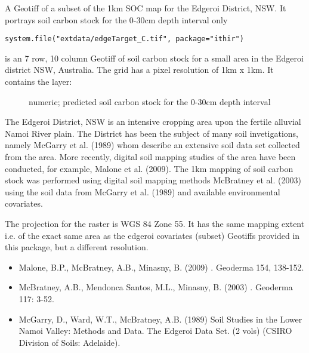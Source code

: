 \documentclass[a4paper]{book}
\begin{document}
%
\begin{Description}
A Geotiff of a subset of the 1km SOC map for the Edgeroi District, NSW. It portrays soil carbon stock for the 0-30cm depth interval only
\end{Description}
%
\begin{Usage}
\begin{verbatim}
system.file("extdata/edgeTarget_C.tif", package="ithir")
\end{verbatim}
\end{Usage}
%
\begin{Format}
 is an 7 row, 10 column Geotiff of soil carbon stock for a small area in the Edgeroi district NSW, Australia. The grid has a pixel resolution of 1km x 1km. It contains the layer:
\begin{description}

\item[] numeric; predicted soil carbon stock for the 0-30cm depth interval

\end{description}

\end{Format}
%
\begin{Details}
The Edgeroi District, NSW is an intensive cropping area upon the fertile alluvial Namoi River plain. The District has been the subject of many soil invetigations, namely McGarry et al. (1989) whom describe an extensive soil data set collected from the area. More recently, digital soil mapping studies of the area have been conducted, for example, Malone et al. (2009). The 1km mapping of soil carbon stock was performed using digital soil mapping methods McBratney et al. (2003) using the soil data from McGarry et al. (1989) and available environmental covariates.
\end{Details}
%
\begin{Note}
The projection for the raster is WGS 84 Zone 55. It has the same mapping extent i.e. of the exact same area as the edgeroi covariates (subset) Geotiffs provided in this package, but a different resolution.
\end{Note}
%
\begin{References}
\begin{itemize}

\item{} Malone, B.P., McBratney, A.B., Minasny, B. (2009) . Geoderma 154, 138-152.
\item{} McBratney, A.B., Mendonca Santos, M.L., Minasny, B. (2003) . Geoderma 117: 3-52.
\item{} McGarry, D., Ward, W.T., McBratney, A.B. (1989) Soil Studies in the Lower Namoi Valley: Methods and Data. The Edgeroi Data Set. (2 vols) (CSIRO Division of Soils: Adelaide).

\end{itemize}

\end{References}
\end{document}
